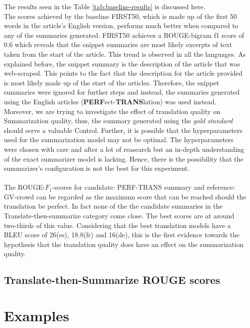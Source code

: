 \documentclass[12pt,a4paper,twoside,openright]{report}
\newcommand{\fone}{$F_1$}
\begin{document}
The results seen in the Table \ref{tab:baseline-results} is discussed here. \\
The scores achieved by the baseline FIRST50, which is made up of the first 50 words in the article's English version, performs much better when compared to any of the summaries generated. FIRST50 achieves a ROUGE-bigram f1 score of 0.6 which reveals that the snippet summaries are most likely excerpts of text taken from the start of the article. This trend is observed in all the languages. As explained before, the snippet summary is the description of the article that was web-scraped. This points to the fact that the description for the article provided is most likely made up of the start of the articles. Therefore, the snippet summaries were ignored for further steps and instead, the summaries generated using the English articles (\textbf{PERF}{ect}-\textbf{TRANS}{lation}) was used instead. Moreover, we are trying to investigate the effect of translation quality on Summarization quality, thus, the summary generated using the \textit{gold standard} should serve a valuable Control. Further, it is possible that the hyperparameters used for the summarization model may not be optimal. The hyperparameters were chosen with care and after a lot of reasearch but an in-depth understanding of the exact summarizer model is lacking. Hence, there is the possibility that the summarizer's configuration is not the best for this experiment.  
\\\\
The ROUGE-\fone-scores for candidate: PERF-TRANS summary and reference: GV-crowd can be regarded as the maximum score that can be reached should the translation be perfect. In fact none of the the candidate summaries in the Translate-then-summarize category come close. The best scores are at around two-thirds of this value. Considering that the best translation models have a BLEU score of 26(es), 18.8(fr) and 16(de), this is the first evidence towards the hypothesis that the translation quality does have an effect on the summarization quality. 


\subsection{Translate-then-Summarize ROUGE scores}





\section{Examples}
\end{document}
